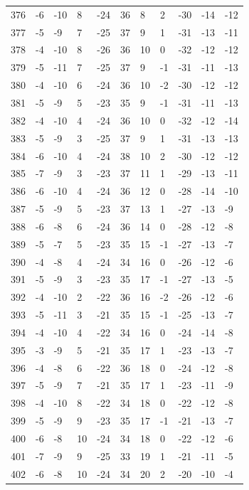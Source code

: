 \begin{table}[H]
\begin{tabular}{lllllllllll}
376 & -6 & -10 & 8 & -24 & 36 & 8 & 2 & -30 & -14 & -12 \\
377 & -5 & -9 & 7 & -25 & 37 & 9 & 1 & -31 & -13 & -11 \\
378 & -4 & -10 & 8 & -26 & 36 & 10 & 0 & -32 & -12 & -12 \\
379 & -5 & -11 & 7 & -25 & 37 & 9 & -1 & -31 & -11 & -13 \\
380 & -4 & -10 & 6 & -24 & 36 & 10 & -2 & -30 & -12 & -12 \\
381 & -5 & -9 & 5 & -23 & 35 & 9 & -1 & -31 & -11 & -13 \\
382 & -4 & -10 & 4 & -24 & 36 & 10 & 0 & -32 & -12 & -14 \\
383 & -5 & -9 & 3 & -25 & 37 & 9 & 1 & -31 & -13 & -13 \\
384 & -6 & -10 & 4 & -24 & 38 & 10 & 2 & -30 & -12 & -12 \\
385 & -7 & -9 & 3 & -23 & 37 & 11 & 1 & -29 & -13 & -11 \\
386 & -6 & -10 & 4 & -24 & 36 & 12 & 0 & -28 & -14 & -10 \\
387 & -5 & -9 & 5 & -23 & 37 & 13 & 1 & -27 & -13 & -9 \\
388 & -6 & -8 & 6 & -24 & 36 & 14 & 0 & -28 & -12 & -8 \\
389 & -5 & -7 & 5 & -23 & 35 & 15 & -1 & -27 & -13 & -7 \\
390 & -4 & -8 & 4 & -24 & 34 & 16 & 0 & -26 & -12 & -6 \\
391 & -5 & -9 & 3 & -23 & 35 & 17 & -1 & -27 & -13 & -5 \\
392 & -4 & -10 & 2 & -22 & 36 & 16 & -2 & -26 & -12 & -6 \\
393 & -5 & -11 & 3 & -21 & 35 & 15 & -1 & -25 & -13 & -7 \\
394 & -4 & -10 & 4 & -22 & 34 & 16 & 0 & -24 & -14 & -8 \\
395 & -3 & -9 & 5 & -21 & 35 & 17 & 1 & -23 & -13 & -7 \\
396 & -4 & -8 & 6 & -22 & 36 & 18 & 0 & -24 & -12 & -8 \\
397 & -5 & -9 & 7 & -21 & 35 & 17 & 1 & -23 & -11 & -9 \\
398 & -4 & -10 & 8 & -22 & 34 & 18 & 0 & -22 & -12 & -8 \\
399 & -5 & -9 & 9 & -23 & 35 & 17 & -1 & -21 & -13 & -7 \\
400 & -6 & -8 & 10 & -24 & 34 & 18 & 0 & -22 & -12 & -6 \\
401 & -7 & -9 & 9 & -25 & 33 & 19 & 1 & -21 & -11 & -5 \\
402 & -6 & -8 & 10 & -24 & 34 & 20 & 2 & -20 & -10 & -4 \\

\end{tabular}
\end{table}
